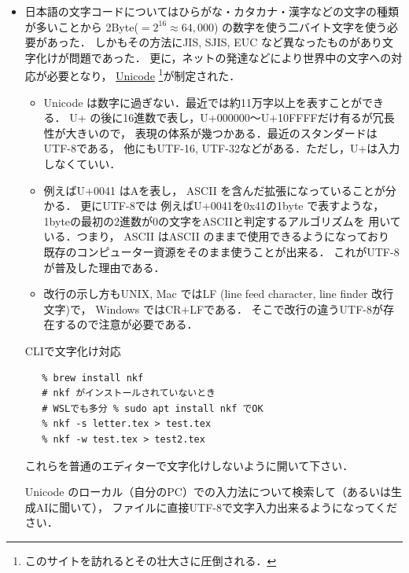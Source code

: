 \begin{itemize}
\begin{exQ}
   タッチタイピングを練習して下さい．
\end{exQ}



   \item
   日本語の文字コードについてはひらがな・カタカナ・漢字などの文字の種類が多いことから
   2Byte($=2^{16}\approx  64,000$) の数字を使う二バイト文字を使う必要があった．
   しかもその方法にJIS, SJIS, EUC など異なったものがあり文字化けが問題であった．
   更に，ネットの発達などにより世界中の文字への対応が必要となり， 
   \href{https://home.unicode.org/}{Unicode}
   \footnote{このサイトを訪れるとその壮大さに圧倒される．}が制定された．
   \begin{itemize}
      \item
      Unicode は数字に過ぎない．最近では約11万字以上を表すことができる．
      U+ の後に16進数で表し，U+000000〜U+10FFFFだけ有るが冗長性が大きいので，
      表現の体系が幾つかある．最近のスタンダードはUTF-8である，
      他にもUTF-16, UTF-32などがある．ただし，U+は入力しなくていい．
      
      \item
      例えばU+0041 はAを表し，
      ASCII を含んだ拡張になっていることが分かる．
      更にUTF-8では
      例えばU+0041を0x41の1byte で表すような，
      1byteの最初の2進数が0の文字をASCIIと判定するアルゴリズムを
      用いている．つまり，
      ASCII はASCII のままで使用できるようになっており
      既存のコンピューター資源をそのまま使うことが出来る．
      これがUTF-8が普及した理由である\cite{Y}．
       
      \item
      改行の示し方もUNIX, Mac ではLF (line feed character, line finder 改行文字)で，
      Windows ではCR+LFである．
      そこで改行の違うUTF-8が存在するので注意が必要である．
   \end{itemize}

   \begin{Q}
   CLIで文字化け対応 
\begin{verbatim}
   % brew install nkf  
   # nkf がインストールされていないとき
   # WSLでも多分 % sudo apt install nkf でOK
   % nkf -s letter.tex > test.tex
   % nkf -w test.tex > test2.tex
\end{verbatim}   %
   これらを普通のエディターで文字化けしないように開いて下さい．
   \end{Q}
   \begin{Q}
   Unicode のローカル（自分のPC）での入力法について検索して（あるいは生成AIに聞いて），
   ファイルに直接UTF-8で文字入力出来るようになってください．
   

\end{Q}
\end{itemize}
